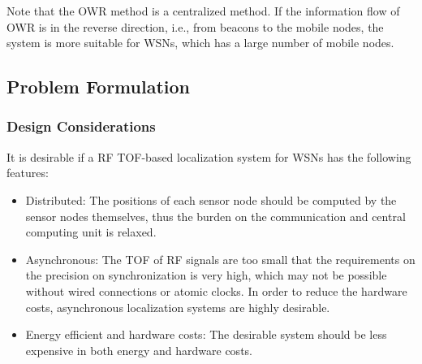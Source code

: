 Note that the OWR method is a centralized method.
If the information flow of OWR is in the reverse direction, i.e., from beacons to the mobile nodes, the system is more suitable for WSNs, which has a large number of mobile nodes. 


\subsection{Problem Formulation}
\subsubsection{Design Considerations}
It is desirable if a RF TOF-based localization system for WSNs has the following features:
\begin{itemize}
\item Distributed: The positions of each sensor node should be computed by the sensor nodes themselves, thus the burden on the communication and central computing unit is relaxed.
\item Asynchronous: The TOF of RF signals are too small that the requirements on the precision on synchronization is very high, which may not be possible without wired connections or atomic clocks. In order to reduce the hardware costs, asynchronous localization systems are highly desirable.
\item Energy efficient and hardware costs: The desirable system should be less expensive in both energy and hardware costs.
\end{itemize}




